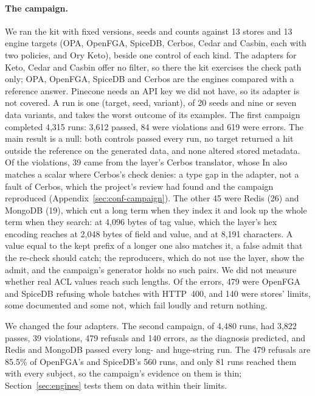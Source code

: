 \paragraph{The campaign.}
We ran the kit with fixed versions, seeds and counts against 13 stores and 13 engine targets (OPA, OpenFGA, SpiceDB,
Cerbos, Cedar and Casbin, each with two policies, and Ory Keto), beside one control of each kind. The adapters for Keto, Cedar and
Casbin offer no filter, so there the kit exercises the check path only; OPA, OpenFGA, SpiceDB and Cerbos are the engines compared with a
reference answer. Pinecone needs an API key we did not
have, so its adapter is not covered. A run is one (target, seed, variant), of 20 seeds and nine or seven data variants,
and takes the worst outcome of its examples. The first campaign completed 4,315 runs: 3,612 passed, 84 were violations and 619 were errors.
The main result is a null: both controls passed every run, no target returned a hit outside the reference on the generated data, and none altered stored metadata.
Of the violations, 39 came from the layer's Cerbos translator, whose $\mathrm{In}$ also matches a scalar where Cerbos's check denies: a type gap in the adapter, not a fault of Cerbos, which the project's review had found and the campaign
reproduced (Appendix~\ref{sec:conf-campaign}). The other 45 were Redis (26) and MongoDB (19), which cut a long term when they index it and look up the
whole term when they search: at 4,096 bytes of tag value, which the layer's hex encoding reaches at 2,048 bytes of field and
value, and at 8,191 characters. A value equal to the kept prefix of a longer one also matches it, a false admit that the re-check should catch; the reproducers, which do not use the layer, show the admit, and the campaign's generator holds no such pairs. We did not measure whether real ACL values reach such lengths. Of the errors, 479 were OpenFGA and SpiceDB refusing whole batches with HTTP~400, and
140 were stores' limits, some documented and some not, which fail loudly and return nothing.

We changed the four adapters. The second campaign, of
4,480 runs, had 3,822 passes, 39 violations, 479 refusals and 140 errors, as the diagnosis predicted, and Redis and MongoDB
passed every long- and huge-string run. The 479 refusals are 85.5\% of OpenFGA's and SpiceDB's 560 runs, and only 81 runs reached them with every
subject, so the campaign's evidence on them is thin; Section~\ref{sec:engines} tests them on data within their limits.

